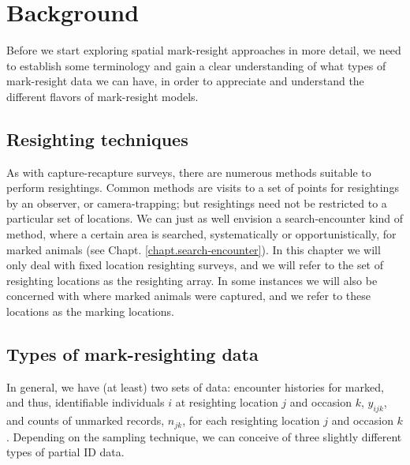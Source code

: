 \section{Background}
Before we start exploring spatial mark-resight approaches in more detail, we
need to establish some terminology and gain a clear understanding of what types of mark-resight data we can
have, in order to appreciate and understand the different flavors of
mark-resight models.

\subsection{Resighting techniques}
As with capture-recapture surveys, there
are numerous
methods suitable to perform resightings. Common methods are visits to a set of points for resightings by an observer, or camera-trapping; but resightings need not be restricted to a particular set of locations. We can just as well envision a search-encounter kind of method, where a certain area is searched, systematically or opportunistically, for marked animals (see Chapt. \ref{chapt.search-encounter}). In this chapter we will only deal with fixed location resighting surveys, and we will refer to the set of resighting locations as the resighting array. In some instances we will also be concerned with where marked animals were captured, and we refer to these locations as the marking locations.

\subsection{Types of mark-resighting data}

In general, we have (at least) two sets of data:
encounter histories for marked, and thus,
identifiable
individuals $i$ at resighting location $j$ and
occasion $k$, $y_{ijk}$, and counts of
unmarked records, $n_{jk}$,
for each resighting location
$j$ and occasion $k$.
Depending on the sampling technique, we can
conceive of three slightly different types of partial ID data.


